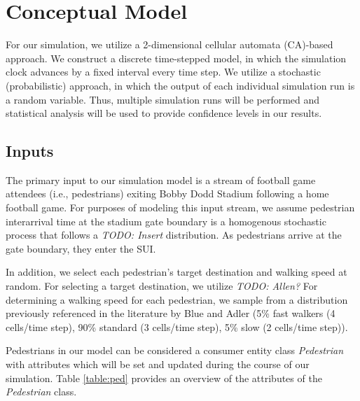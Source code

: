 \documentclass[12pt]{article}
\begin{document}
\section{Conceptual Model}
For our simulation, we utilize a 2-dimensional cellular automata (CA)-based
approach. We construct a discrete time-stepped model, in which the simulation
clock advances by a fixed interval every time step. We utilize a stochastic
(probabilistic) approach, in which the output of each individual simulation
run is a random variable. Thus, multiple simulation runs will be performed and
statistical analysis will be used to provide confidence levels in our results.

\subsection{Inputs}
The primary input to our simulation model is a stream of football game attendees
(i.e., pedestrians) exiting Bobby Dodd Stadium following a home football game.
For purposes of modeling this input stream, we assume pedestrian interarrival
time at the stadium gate boundary is a homogenous stochastic process that
follows a \textit{TODO: Insert} distribution. As pedestrians arrive at the gate
boundary, they enter the SUI.

In addition, we select each pedestrian's target destination and walking
speed at random. For selecting a target destination, we utilize \textit{TODO: Allen?}
For determining a walking speed for each pedestrian, we sample from a
distribution previously referenced in the literature by Blue and Adler
\cite{blue2001cellular} (5\% fast walkers (4 cells/time step), 90\% standard
(3 cells/time step), 5\% slow (2 cells/time step)).

Pedestrians in our model can be considered a consumer entity class
\textit{Pedestrian} with attributes which will be set and updated during the
course of our simulation. Table \ref{table:ped} provides an overview of the
attributes of the \textit{Pedestrian} class.
\end{document}
